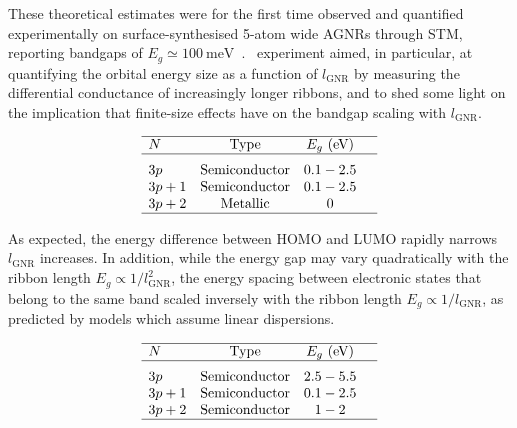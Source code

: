 These theoretical estimates were for the first time observed and quantified experimentally on surface-synthesised 5-atom wide \glspl{AGNR} through \gls{STM}, reporting bandgaps of $E_g\simeq\SI{100}{\milli\electronvolt}$~\cite{kimouche2015ultra, de2016substrate, carbonell2018electronic}.~\citeauthor{kimouche2015ultra} experiment aimed, in particular, at quantifying the orbital energy size as a function of $l_\textrm{GNR}$ by measuring the differential conductance of increasingly longer ribbons, and to shed some light on the implication that finite-size effects have on the bandgap scaling with $l_\textrm{GNR}$.
%
\begin{table}
    \caption{\label{tab:agnr-tb}
        Prediction of \gls{AGNR} electronic properties based on TB.}
    \[
        \begin{array}{lccc}
            \hline N & \text{Type}          & E_g~\text{(eV)}                   & \\
            \hline
            3p       & \text{Semiconductor} & 0.1-2.5                   \Tsmall   \\
            3p+1     & \text{Semiconductor} & 0.1-2.5                             \\
            3p+2     & \text{Metallic}      & 0                                   \\
            \hline
        \end{array}
    \]
\end{table}
%
As expected, the energy difference between \gls{HOMO} and \gls{LUMO} rapidly narrows $l_\textrm{GNR}$ increases. In addition, while the energy gap may vary quadratically with the ribbon length $E_g \propto 1/l_\textrm{GNR}^2$, the energy spacing between electronic states that belong to the same band scaled inversely with the ribbon length $E_g \propto 1/l_\textrm{GNR}$, as predicted by models which assume linear dispersions.
%
\begin{table}
    \caption{\label{tab:agnr-gw}
        Prediction of \gls{AGNR} electronic properties based on the Green's function formalism within the \textit{GW} approximation.}
    \[
        \begin{array}{lccc}
            \hline N & \text{Type}          & E_g~\text{(eV)}           & \\
            \hline
            3p       & \text{Semiconductor} & 2.5-5.5           \Tsmall   \\
            3p+1     & \text{Semiconductor} & 0.1-2.5                     \\
            3p+2     & \text{Semiconductor} & 1-2                         \\
            \hline
        \end{array}
    \]
\end{table}
